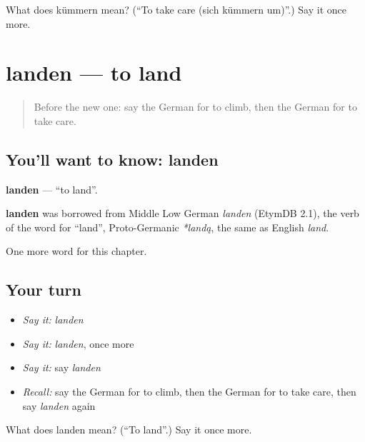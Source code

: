 \begin{tcolorbox}[breakable,colback=teal!4,colframe=teal!35!black,title={Before you move on}]
What does kümmern mean? (\textquotedblleft{}To take care (sich kümmern um)\textquotedblright{}.) Say it once more.
\end{tcolorbox}
\section[landen]{landen — to land}

\label{lesson:GE-C182-landen}



\begin{quote}
Before the new one: say the German for to climb, then the German for to take care.
\end{quote}

\subsection*{You'll want to know: landen}
\textbf{landen} — \textquotedblleft{}to land\textquotedblright{}.

\begin{cousinweb}
\textbf{landen} was borrowed from Middle Low German \emph{landen} (EtymDB 2.1), the verb of the word for \textquotedblleft{}land\textquotedblright{}, Proto-Germanic \emph{*landą}, the same as English \emph{land}.
\end{cousinweb}

\begin{grammarlens}[title={What you've built}]
One more word for this chapter.
\end{grammarlens}

\subsection*{Your turn}
\begin{itemize}
\raggedright
  \item \emph{Say it:} \emph{landen}
  \item \emph{Say it:} \emph{landen}, once more
  \item \emph{Say it:} say \emph{landen}
  \item \emph{Recall:} say the German for to climb, then the German for to take care, then say \emph{landen} again
\end{itemize}

\begin{tcolorbox}[breakable,colback=teal!4,colframe=teal!35!black,title={Before you move on}]
What does landen mean? (\textquotedblleft{}To land\textquotedblright{}.) Say it once more.
\end{tcolorbox}
